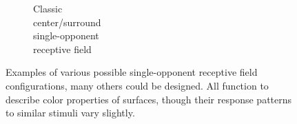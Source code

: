 \documentclass{article}
\begin{document}
\begin{figure}[h]
\begin{subfigure}{0.3\textwidth}
        \centering
        \caption{Classic \\ center/surround \\ single-opponent \\ receptive field}
    \end{subfigure}%
    \caption{Examples of various possible single-opponent receptive field configurations, many others could be designed. All function to describe color properties of surfaces, though their response patterns to similar stimuli vary slightly.}
\end{figure}
\end{document}
